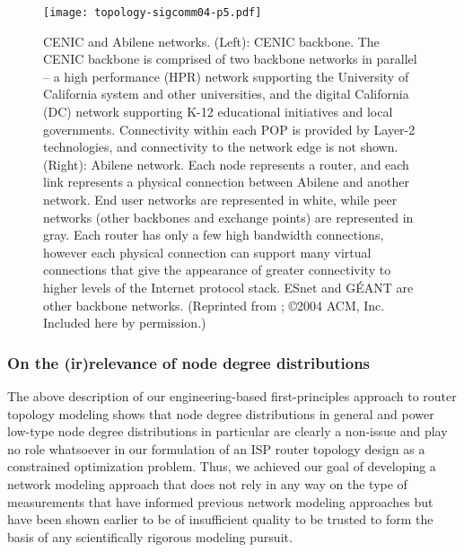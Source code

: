 \begin{figure}[htb] 
  \begin{center}
    
    \texttt{[image: topology-sigcomm04-p5.pdf]}
   
    \caption{CENIC and Abilene networks. (Left): CENIC backbone. The
      CENIC backbone is comprised of two backbone networks in
      parallel -- a high performance (HPR) network supporting the
      University of California system and other universities, and the
      digital California (DC) network supporting K-12 educational
      initiatives and local governments. Connectivity within each POP
      is provided by Layer-2 technologies, and connectivity to the
      network edge is not shown. (Right): Abilene network. Each node
      represents a router, and each link represents a physical
      connection between Abilene and another network. End user
      networks are represented in white, while peer networks (other
      backbones and exchange points) are represented in gray. Each
      router has only a few high bandwidth connections, however each
      physical connection can support many virtual connections that
      give the appearance of greater connectivity to higher levels of
      the Internet protocol stack. ESnet and G\'{E}ANT are other backbone
      networks. (Reprinted from \cite{Li04}; \copyright 2004 ACM, Inc. Included here by permission.)
     \label{fig:cenic_abilene}}
  \end{center}
\end{figure}         

\subsubsection{On the (ir)relevance of node degree distributions}

The above description of our engineering-based first-principles
approach to router topology modeling shows that node degree
distributions in general and power low-type node degree distributions
in particular are clearly a non-issue and play no role whatsoever in
our formulation of an ISP router topology design as a constrained
optimization problem. Thus, we achieved our goal of developing a
network modeling approach that does not rely in any way on the type of
measurements that have informed previous network modeling approaches
but have been shown earlier to be of insufficient quality to be
trusted to form the basis of any scientifically rigorous modeling
pursuit.

